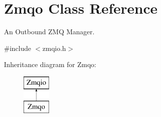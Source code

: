 \hypertarget{classZmqo}{\section{Zmqo Class Reference}
\label{classZmqo}
}


An Outbound Z\-M\-Q Manager.  




{\ttfamily \#include $<$zmqio.\-h$>$}

Inheritance diagram for Zmqo\-:\begin{figure}[H]
\begin{center}
\leavevmode
\includegraphics[height=2.000000cm]{classZmqo}
\end{center}
\end{figure}
